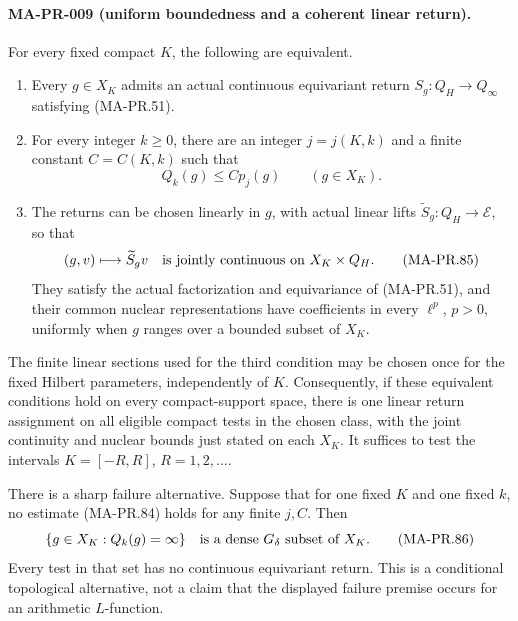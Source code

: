 \paragraph{MA-PR-009 (uniform boundedness and a coherent linear return).}
For every fixed compact \(K\), the following are equivalent.
\begin{enumerate}
\item Every \(g\in X_K\) admits an actual continuous
equivariant return \(S_g:Q_H\to Q_\infty\) satisfying
(MA-PR.51).
\item For every integer \(k\ge0\), there are an integer
\(j=j(K,k)\) and a finite constant \(C=C(K,k)\) such that
\[
                   Q_k(g)\le C p_j(g)\qquad(g\in X_K).
 \tag{MA-PR.84}
\]
\item The returns can be chosen linearly in \(g\), with
actual linear lifts \(\widetilde S_g:Q_H\to\mathcal E\),
so that
\[
           (g,v)\longmapsto\widetilde S_gv
                     \quad\hbox{is jointly continuous on }
                     X_K\times Q_H .
 \tag{MA-PR.85}
\]
They satisfy the actual factorization and equivariance
of (MA-PR.51), and their common nuclear representations
have coefficients in every \(\ell^p\), \(p>0\), uniformly
when \(g\) ranges over a bounded subset of \(X_K\).
\end{enumerate}
The finite linear sections used for the third condition
may be chosen once for the fixed Hilbert parameters,
independently of \(K\).
Consequently, if these equivalent conditions hold on
every compact-support space, there is one linear return
assignment on all eligible compact tests in the chosen class, with the
joint continuity and nuclear bounds just stated on
each \(X_K\).
It suffices to test the intervals \(K=[-R,R]\),
\(R=1,2,\ldots\).

There is a sharp failure alternative.  Suppose that
for one fixed \(K\) and one fixed \(k\), no estimate
(MA-PR.84) holds for any finite \(j,C\).
Then
\[
       \{g\in X_K:Q_k(g)=\infty\}
          \quad\hbox{is a dense }G_\delta\hbox{ subset of }X_K .
 \tag{MA-PR.86}
\]
Every test in that set has no continuous equivariant
return.  This is a conditional topological alternative,
not a claim that the displayed failure premise occurs
for an arithmetic \(L\)-function.

